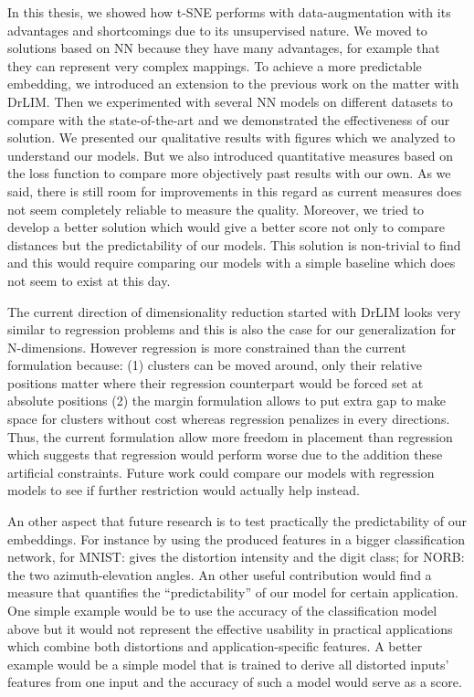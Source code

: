 \documentclass[a4paper,12pt]{report}
\begin{document}
In this thesis, we showed how t-SNE performs with data-augmentation with its advantages and shortcomings due to its unsupervised nature.
We moved to solutions based on NN because they have many advantages, for example that they can represent very complex mappings.
To achieve a more predictable embedding, we introduced an extension to the previous work on the matter with DrLIM.
Then we experimented with several NN models on different datasets to compare with the state-of-the-art and we demonstrated the effectiveness of our solution.
We presented our qualitative results with figures which we analyzed to understand our models.
But we also introduced quantitative measures based on the loss function to compare more objectively past results with our own.
As we said, there is still room for improvements in this regard as current measures does not seem completely reliable to measure the quality.
Moreover, we tried to develop a better solution which would give a better score not only to compare distances but the predictability of our models.
This solution is non-trivial to find and this would require comparing our models with a simple baseline which does not seem to exist at this day.

The current direction of dimensionality reduction started with DrLIM looks very similar to regression problems and this is also the case for our generalization for N-dimensions.
However regression is more constrained than the current formulation because: (1) clusters can be moved around, only their relative positions matter where their regression counterpart would be forced set at absolute positions (2) the margin formulation allows to put extra gap to make space for clusters without cost whereas regression penalizes in every directions.
Thus, the current formulation allow more freedom in placement than regression which suggests that regression would perform worse due to the addition these artificial constraints.
Future work could compare our models with regression models to see if further restriction would actually help instead.

An other aspect that future research is to test practically the predictability of our embeddings.
For instance by using the produced features in a bigger classification network, for MNIST: gives the distortion intensity and the digit class; for NORB: the two azimuth-elevation angles.
An other useful contribution would find a measure that quantifies the ``predictability'' of our model for certain application.
One simple example would be to use the accuracy of the classification model above but it would not represent the effective usability in practical applications which combine both distortions and application-specific features.
A better example would be a simple model that is trained to derive all distorted inputs' features from one input and the accuracy of such a model would serve as a score.
\end{document}
